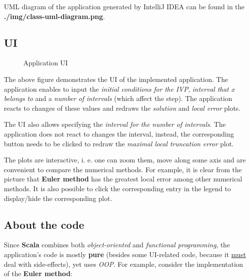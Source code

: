 \documentclass[12pt,a4paper,titlepage]{article}
\begin{document}
  UML diagram of the application generated by IntelliJ IDEA can be found in the \textbf{./img/class-uml-diagram.png}.

  \newpage
  \subsection{UI}

  \begin{figure}[h!]
    \centering
    \caption{Application UI}
  \end{figure}

  The above figure demonstrates the UI of the implemented application. The application enables to input the \textit{initial conditions for the IVP}, \textit{interval that $x$ belongs to} and a \textit{number of intervals} (which affect the step). The application reacts to changes of these values and redraws the \textit{solution} and \textit{local error} plots.

  The UI also allows specifying the \textit{interval for the number of intervals}. The application does not react to changes the interval, instead, the corresponding button needs to be clicked to redraw the \textit{maximal local truncation error} plot.

  The plots are interactive, i. e. one can zoom them, move along some axis and are convenient to compare the numerical methods. For example, it is clear from the picture that \textbf{Euler method} has the greatest local error among other numerical methods. It is also possible to click the corresponding entry in the legend to display/hide the corresponding plot.

  \newpage
  \subsection{About the code}
  Since \textbf{Scala} combines both \textit{object-oriented} and \textit{functional programming}, the application's code is mostly \textbf{pure} (besides some UI-related code, because it \underline{must} deal with side-effects), yet uses \textit{OOP}. For example, consider the implementation of the \textbf{Euler method}:
\end{document}
